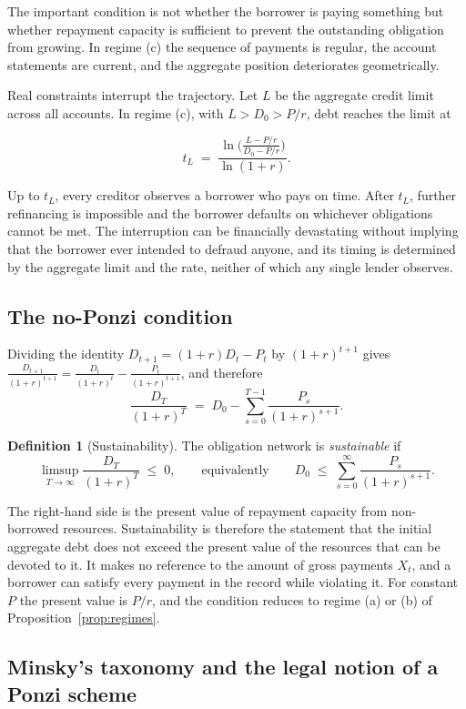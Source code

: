 \documentclass[11pt]{article}
\theoremstyle{definition}
\newtheorem{definition}[theorem]{Definition}
\theoremstyle{remark}
\begin{document}
The important condition is not whether the borrower is paying something but whether repayment capacity is sufficient to prevent the outstanding obligation from growing. In regime (c) the sequence of payments is regular, the account statements are current, and the aggregate position deteriorates geometrically.

Real constraints interrupt the trajectory. Let $L$ be the aggregate credit limit across all accounts. In regime (c), with $L>D_0>P/r$, debt reaches the limit at

\[
t_L \;=\; \frac{\ln\!\big(\tfrac{L-P/r}{D_0-P/r}\big)}{\ln(1+r)} .
\]

Up to $t_L$, every creditor observes a borrower who pays on time. After $t_L$, further refinancing is impossible and the borrower defaults on whichever obligations cannot be met. The interruption can be financially devastating without implying that the borrower ever intended to defraud anyone, and its timing is determined by the aggregate limit and the rate, neither of which any single lender observes.

\subsection{The no-Ponzi condition}

Dividing the identity $D_{t+1}=(1+r)D_t-P_t$ by $(1+r)^{t+1}$ gives $\frac{D_{t+1}}{(1+r)^{t+1}}=\frac{D_t}{(1+r)^t}-\frac{P_t}{(1+r)^{t+1}}$, and therefore
\[
\frac{D_T}{(1+r)^T} \;=\; D_0-\sum_{s=0}^{T-1}\frac{P_s}{(1+r)^{s+1}} .
\]

\begin{definition}[Sustainability]\label{def:sustain}
The obligation network is \emph{sustainable} if
\[
\limsup_{T\to\infty}\frac{D_T}{(1+r)^T}\;\le\;0,
\qquad\text{equivalently}\qquad
D_0\;\le\;\sum_{s=0}^{\infty}\frac{P_s}{(1+r)^{s+1}} .
\]
\end{definition}

The right-hand side is the present value of repayment capacity from non-borrowed resources. Sustainability is therefore the statement that the initial aggregate debt does not exceed the present value of the resources that can be devoted to it. It makes no reference to the amount of gross payments $X_t$, and a borrower can satisfy every payment in the record while violating it. For constant $P$ the present value is $P/r$, and the condition reduces to regime (a) or (b) of Proposition~\ref{prop:regimes}.

\subsection{Minsky's taxonomy and the legal notion of a Ponzi scheme}
\end{document}
